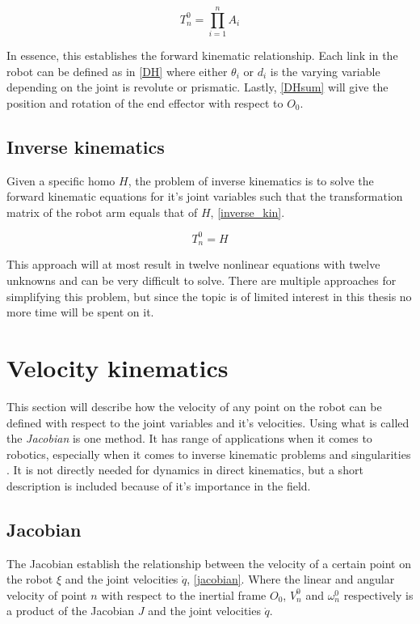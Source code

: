 \begin{equation}\label{DHsum}
T^0_n=\prod_{i=1}^{n}A_i
\end{equation}

In essence, this establishes the forward kinematic relationship. Each link in the robot can be defined as in \eqref{DH} where either $\theta_i$ or $d_i$ is the varying variable depending on the joint is revolute or prismatic. Lastly, \eqref{DHsum} will give the position and rotation of the end effector with respect to $O_0$.

\subsection{Inverse kinematics}

Given a specific \gls{homo} $H$, the problem of inverse kinematics is to solve the forward kinematic equations for it's joint variables such that the transformation matrix of the robot arm equals that of $H$, \eqref{inverse_kin}.

\begin{equation}\label{inverse_kin}
T^0_n = H
\end{equation}

This approach will at most result in twelve nonlinear equations with twelve unknowns and can be very difficult to solve. There are multiple approaches for simplifying this problem, but since the topic is of limited interest in this thesis no more time will be spent on it.

\section{Velocity kinematics}

This section will describe how the velocity of any point on the robot can be defined with respect to the joint variables and it's velocities. Using what is called the \textit{Jacobian} is one method. It has range of applications when it comes to robotics, especially when it comes to inverse kinematic problems \cite{Duleba2013} and singularities \cite{Shi2012}. It is not directly needed for dynamics in direct kinematics, but a short description is included because of it's importance in the field.

\subsection{Jacobian}

The Jacobian establish the relationship between the velocity of a certain point on the robot $\xi$ and the joint velocities $\dot{q}$, \eqref{jacobian}. Where the linear and angular velocity of point $n$ with respect to the inertial frame $O_0$, $V^0_n$ and $\omega^0_n$ respectively is a product of the Jacobian $J$ and the joint velocities $\dot{q}$. 

